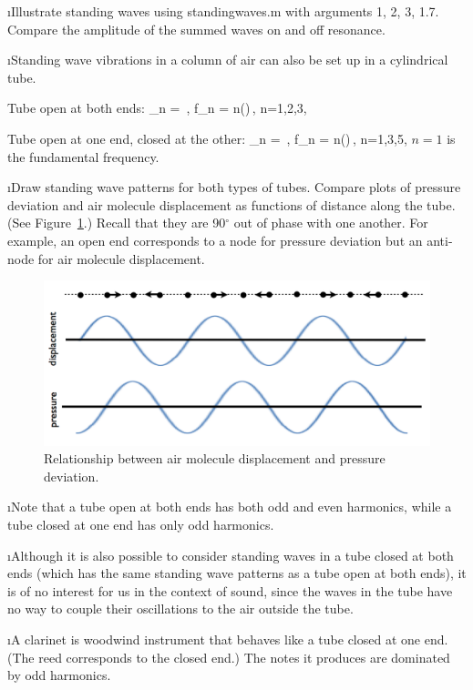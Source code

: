 \i \demo Illustrate standing waves using standingwaves.m
with arguments 1, 2, 3, 1.7.
Compare the amplitude of the summed waves on and off resonance.

\i Standing wave vibrations in a column of air
can also be set up in a cylindrical tube.

Tube open at both ends:
%
\be
\lambda_n = \,,
\quad
f_n = n\left(\right)\,,
\quad n=1,2,3, \cdots
\ee
%

Tube open at one end, closed at the other:
%
\be
\lambda_n = \,,
\quad
f_n = n\left(\right)\,,
\quad n=1,3,5, \cdots
\ee
$n=1$ is the fundamental frequency.

\i Draw standing wave patterns for both types of
tubes.
Compare plots of pressure deviation and air molecule
displacement as functions of distance along the tube.
(See Figure~\ref{f:displacement-pressure}.)
Recall that they are 90$^\circ$ out of phase with one another.
For example, an open end corresponds to a node for 
pressure deviation but an anti-node for air molecule displacement.
%
\begin{figure}[htbp]
  \begin{center}
  \includegraphics[width=.9\textwidth]{displacement-pressure.pdf}
  \caption{Relationship between air molecule displacement and pressure deviation.}
  \label{f:displacement-pressure}
  \end{center}
\end{figure}

\i Note that a tube open at both ends has both odd
and even harmonics, while a tube closed at one 
end has only odd harmonics.

\i Although it is also possible to consider standing 
waves in a tube closed at both ends (which has the 
same standing wave patterns as a
tube open at both ends), it is of no interest for us
in the context of sound, since the waves in the tube
have no way to couple their oscillations to the air
outside the tube.
 
\i \ex A clarinet is woodwind instrument that 
behaves like a tube closed at one end.
(The reed corresponds to the closed end.)
The notes it produces are dominated by odd harmonics.

